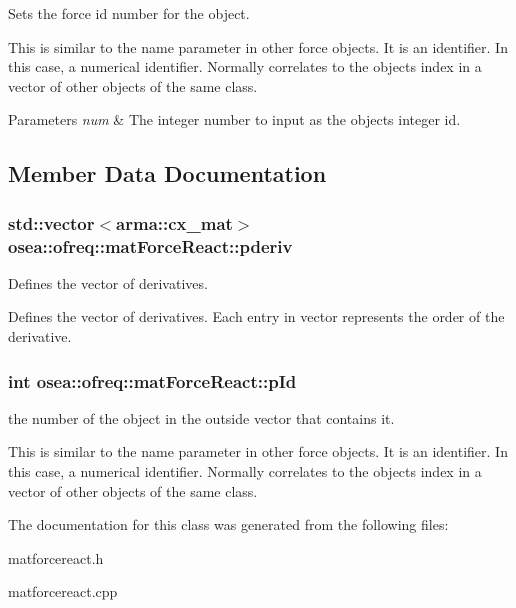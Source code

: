 Sets the force id number for the object. 

This is similar to the name parameter in other force objects. It is an identifier. In this case, a numerical identifier. Normally correlates to the objects index in a vector of other objects of the same class. 
\begin{DoxyParams}{Parameters}
{\em num} & The integer number to input as the objects integer id. \\
\hline
\end{DoxyParams}


\subsection{Member Data Documentation}
\hypertarget{classosea_1_1ofreq_1_1mat_force_react_a827cccb59204d98738a4d98b78942b45}{
\subsubsection[{pderiv}]{\setlength{\rightskip}{0pt plus 5cm}std\-::vector$<$arma\-::cx\-\_\-mat$>$ osea\-::ofreq\-::mat\-Force\-React\-::pderiv\hspace{0.3cm}{\ttfamily [protected]}}}\label{classosea_1_1ofreq_1_1mat_force_react_a827cccb59204d98738a4d98b78942b45}


Defines the vector of derivatives. 

Defines the vector of derivatives. Each entry in vector represents the order of the derivative. \hypertarget{classosea_1_1ofreq_1_1mat_force_react_a890a6fbcf9900d4a37ff05533f350f50}{
\subsubsection[{p\-Id}]{\setlength{\rightskip}{0pt plus 5cm}int osea\-::ofreq\-::mat\-Force\-React\-::p\-Id\hspace{0.3cm}{\ttfamily [protected]}}}\label{classosea_1_1ofreq_1_1mat_force_react_a890a6fbcf9900d4a37ff05533f350f50}


the number of the object in the outside vector that contains it. 

This is similar to the name parameter in other force objects. It is an identifier. In this case, a numerical identifier. Normally correlates to the objects index in a vector of other objects of the same class. 

The documentation for this class was generated from the following files\-:\begin{DoxyCompactItemize}
\item 
matforcereact.\-h\item 
matforcereact.\-cpp\end{DoxyCompactItemize}
